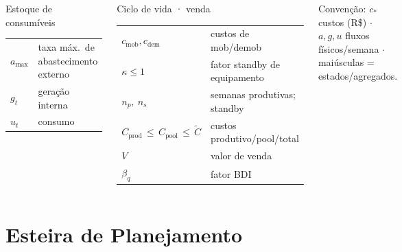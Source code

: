 \documentclass[aspectratio=169,10pt]{beamer}
\begin{document}
\begin{frame}
\begin{columns}[T]
\begin{block}{\small Estoque de consumíveis}
\begin{tabular}{@{}p{1.5cm}p{4.6cm}@{}}
        $a_{\max}$ & taxa máx.\ de abastecimento externo \\
        $g_t$ & geração interna \\
        $u_t$ & consumo \\
      \end{tabular}
    \end{block}
    \begin{block}{\small Ciclo de vida · venda}
      \begin{tabular}{@{}p{2.5cm}p{4.6cm}@{}}
        $c_{\text{mob}},c_{\text{dem}}$ & custos de mob/demob \\
        $\kappa \leq 1$ & fator standby de equipamento \\
        $n_p,\ n_s$ & semanas produtivas; standby \\
        $C_{\text{prod}} \,\leq\, C_{\text{pool}} \,\leq\, \tilde{C}$ & custos produtivo/pool/total \\
        $V$ & valor de venda \\
        $\beta_q$ & fator BDI \\
      \end{tabular}
    \end{block}
    \vspace{2pt}
    {\tiny Convenção: $c_\ast$ custos (R\$) $\cdot$ $a,g,u$ fluxos físicos/semana
    $\cdot$ maiúsculas = estados/agregados.}
  \end{columns}
\end{frame}

\section{Esteira de Planejamento}
\end{document}
